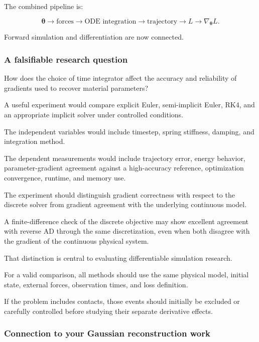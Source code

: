 The combined pipeline is:

\[
\boldsymbol\theta \rightarrow \text{forces} \rightarrow \text{ODE integration} \rightarrow \text{trajectory} \rightarrow L \rightarrow \nabla_{\boldsymbol\theta}L.
\]

Forward simulation and differentiation are now connected.

\subsubsection{A falsifiable research question}\label{02-foundations-ii-ch022-a-falsifiable-research-question}

\hypertarget{02-foundations-ii-ch022-a-falsifiable-research-question}{}

How does the choice of time integrator affect the accuracy and reliability of gradients used to recover material parameters?

A useful experiment would compare explicit Euler, semi-implicit Euler, RK4, and an appropriate implicit solver under controlled conditions.

The independent variables would include timestep, spring stiffness, damping, and integration method.

The dependent measurements would include trajectory error, energy behavior, parameter-gradient agreement against a high-accuracy reference, optimization convergence, runtime, and memory use.

The experiment should distinguish gradient correctness with respect to the discrete solver from gradient agreement with the underlying continuous model.

A finite-difference check of the discrete objective may show excellent agreement with reverse AD through the same discretization, even when both disagree with the gradient of the continuous physical system.

That distinction is central to evaluating differentiable simulation research.

For a valid comparison, all methods should use the same physical model, initial state, external forces, observation times, and loss definition.

If the problem includes contacts, those events should initially be excluded or carefully controlled before studying their separate derivative effects.

\subsubsection{Connection to your Gaussian reconstruction work}\label{02-foundations-ii-ch022-connection-to-your-gaussian-reconstruction-work}

